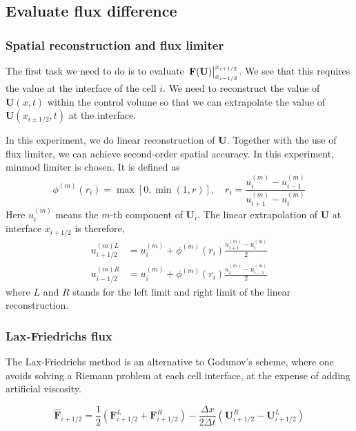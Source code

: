 \documentclass{article}
\begin{document}
    \subsection{Evaluate flux difference}
    \subsubsection{Spatial reconstruction and flux limiter}
    The first task we need to do is to evaluate $\eval{\mathbf{F(U)}}_{x_{i-1/2}}^{x_{i+1/2}}$. We see that this requires the value at the interface of the cell $i$. We need to reconstruct the value of $\mathbf{U}(x,t)$ within the control volume so that we can extrapolate the value of $\mathbf{U}(x_{i\pm1/2}, t)$ at the interface.

    In this experiment, we do linear reconstruction of $\mathbf{U}$. Together with the use of flux limiter, we can achieve second-order spatial accuracy. In this experiment, minmod limiter is chosen. It is defined as
    \begin{equation}
        \phi^{(m)}(r_i) = \max[0, \min(1,r)], \quad r_i = \frac{u^{(m)}_i - u^{(m)}_{i-1}}{u^{(m)}_{i+1} - u^{(m)}_{i}}
    \end{equation}
    Here $u^{(m)}_i$ means the $m$-th component of $\mathbf{U}_i$. The linear extrapolation of $\mathbf{U}$ at interface $x_{i+1/2}$ is therefore,
    \begin{equation}
        \begin{aligned}
            u^{(m)L}_{i+1/2} &= u^{(m)}_{i} + \phi^{(m)}(r_i)\frac{u^{(m)}_{i+1} - u^{(m)}_{i}}{2} \\
            u^{(m)R}_{i-1/2} &= u^{(m)}_{i} + \phi^{(m)}(r_i)\frac{u^{(m)}_{i} - u^{(m)}_{i-1}}{2}
        \end{aligned}
    \end{equation}
    where $L$ and $R$ stands for the left limit and right limit of the linear reconstruction.

    \subsubsection{Lax-Friedrichs flux}
    The Lax-Friedrichs method is an alternative to Godunov's scheme, where one avoids solving a Riemann problem at each cell interface, at the expense of adding artificial viscosity.

    \begin{equation}
        \hat{\mathbf{F}}_{i+1/2} = \frac{1}{2}(\mathbf{F}_{i+1/2}^L + \mathbf{F}_{i+1/2}^R) - \frac{\Delta x}{2\Delta t}(\mathbf{U}_{i+1/2}^R - \mathbf{U}_{i+1/2}^L)
    \end{equation}
   
\end{document}

